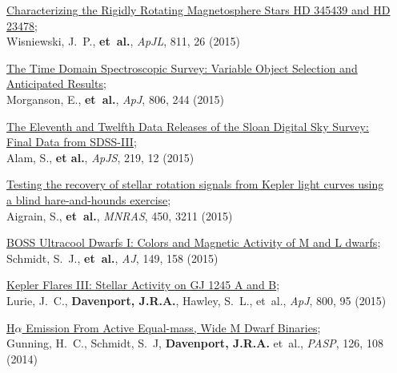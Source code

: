 \documentclass{article}
\begin{document}
\begin{llist}
\begin{etaremune}[leftmargin=10pt]
\item{\sc \href{http://arxiv.org/abs/1509.00128}{\color{NavyBlue}Characterizing the Rigidly Rotating Magnetosphere Stars HD 345439 and HD 23478}};\\
Wisniewski, J.~P., {\bf et~al.}, {\em ApJL}, 811, 26 (2015)

\item{\sc \href{http://arxiv.org/abs/1505.00760}{\color{NavyBlue}The Time Domain Spectroscopic Survey: Variable Object Selection and\\ Anticipated Results}};\\
Morganson, E., {\bf et~al.}, {\em ApJ}, 806, 244 (2015)

\item{\sc \href{http://adsabs.harvard.edu/abs/2015arXiv150100963A}{\color{NavyBlue}The Eleventh and Twelfth Data Releases of the Sloan Digital Sky Survey: \\ Final Data from SDSS-III}}; \\
Alam, S., {\bf et al.}, {\em ApJS}, 219, 12 (2015)

\item{\sc \href{http://adsabs.harvard.edu/abs/2015MNRAS.450.3211A}{\color{NavyBlue}Testing the recovery of stellar rotation signals from Kepler light curves using\\ a blind hare-and-hounds exercise}};\\
Aigrain, S., {\bf et~al.}, {\em MNRAS}, 450, 3211 (2015)

\item{\sc \href{http://adsabs.harvard.edu/abs/2015AJ....149..158S}{\color{NavyBlue}BOSS Ultracool Dwarfs I: Colors and Magnetic Activity of M and L dwarfs}};\\
Schmidt, S.~J., {\bf et~al.}, {\em AJ}, 149, 158 (2015)

\item{\sc \href{http://adsabs.harvard.edu/abs/2015ApJ...800...95L}{\color{NavyBlue}Kepler Flares III: Stellar Activity on GJ 1245 A and B}};\\
Lurie, J.~C., {\bf Davenport, J.R.A.}, Hawley, S.~L., et~al., {\em ApJ}, 800, 95 (2015)

\item{\sc \href{http://adsabs.harvard.edu/abs/2014PASP..126.1081G}{\color{NavyBlue}H$\alpha$ Emission From Active Equal-mass, Wide M Dwarf Binaries}};\\
Gunning, H.~C., Schmidt, S.~J, {\bf Davenport, J.R.A.} et~al., {\em PASP}, 126, 108 (2014)


\end{etaremune}
\end{llist}
\end{document}
